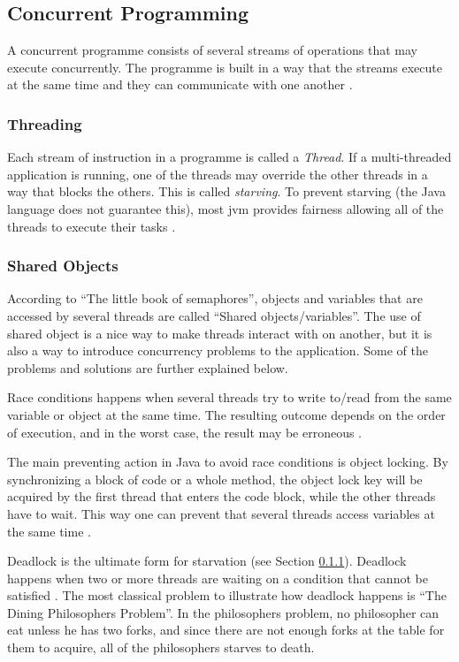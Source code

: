 \subsection{Concurrent Programming}
\label{sec:concurrentprog}
A concurrent programme consists of several streams of operations that may execute concurrently. The programme is built in a way that the streams execute at the same time and they can communicate with one another \cite{cartwright2000}.

\subsubsection{Threading}
\label{sec:threading}
Each stream of instruction in a programme is called a \textit{Thread}. If a multi-threaded application is running, one of the threads may override the other threads in a way that blocks the others. This is called \textit{starving}. To prevent starving (the Java language does not guarantee this), most \acrshort{jvm} provides fairness allowing all of the threads to execute their tasks \cite{cartwright2000}.

\subsubsection{Shared Objects}
\label{sec:sharedobj}
According to ``The little book of semaphores''\cite{downey2008}, objects and variables that are accessed by several threads are called ``Shared objects/variables''. The use of shared object is a nice way to make threads interact with on another, but it is also a way to introduce concurrency problems to the application. Some of the problems and solutions are further explained below.

\label{sec:raisedcond}

Race conditions happens when several threads try to write to/read from the same variable or object at the same time. The resulting outcome depends on the order of execution, and in the worst case, the result may be erroneous \cite{stevecarr2003}. 

\label{sec:synchronization}

The main preventing action in Java to avoid race conditions is object locking. By synchronizing a block of code or a whole method, the object lock key will be acquired by the first thread that enters the code block, while the other threads have to wait. This way one can prevent that several threads access variables at the same time \cite{cartwright2000}.

\newpage
{}
\label{sec:deadlock}

Deadlock is the ultimate form for starvation (see Section \ref{sec:threading}). Deadlock happens when two or more threads are waiting on a condition that cannot be satisfied \cite{sunmicrosystems2005}. The most classical problem to illustrate how deadlock happens is ``The Dining Philosophers Problem''\cite{cartwright2000v2}. In the philosophers problem, no philosopher can eat unless he has two forks, and since there are not enough forks at the table for them to acquire, all of the philosophers starves to death.